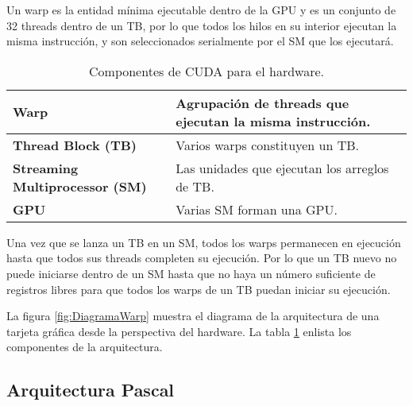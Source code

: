     Un warp es la entidad mínima ejecutable dentro de la GPU y es un conjunto de 32 threads dentro de un TB, por lo que todos los hilos en su interior ejecutan la misma instrucción, y son seleccionados serialmente por el SM que los ejecutará. \cite{WarpLvl}
    \newline
    
        
     \begin{table}[h!]
      \begin{center}
            \footnotesize
        \begin{tabular}{|m{3cm}|m{6cm}|}
         \hline
         \cellcolor{lightgray}\textbf{Warp} & Agrupación de threads que ejecutan la misma instrucción. \\ 
         \hline
          \cellcolor{lightgray}\textbf{Thread Block (TB)} & Varios warps constituyen un TB.\\ 
         \hline  
         \cellcolor{lightgray}\textbf{Streaming Multiprocessor (SM)} & Las unidades que ejecutan los arreglos de TB.\\ 
         \hline
         \cellcolor{lightgray}\textbf{GPU} & Varias SM forman una GPU.\\ 
         \hline
           \end{tabular}
        \caption{Componentes de CUDA para el hardware.}
        \label{tab:CUDAcompHW}
      \end{center}
    \end{table}
    
    Una vez que se lanza un TB en un SM, todos los warps permanecen en ejecución hasta que todos sus threads completen su ejecución. Por lo que un TB nuevo no puede iniciarse dentro de un SM hasta que no haya un número suficiente de registros libres para que todos los warps de un TB puedan iniciar su ejecución.
    \newline
    
    La figura \ref{fig:DiagramaWarp} muestra el diagrama de la arquitectura de una tarjeta gráfica desde la perspectiva del hardware. La tabla \ref{tab:CUDAcompHW} enlista los componentes de la arquitectura.

    \subsection{Arquitectura Pascal}\label{secc:arqPas}
    

